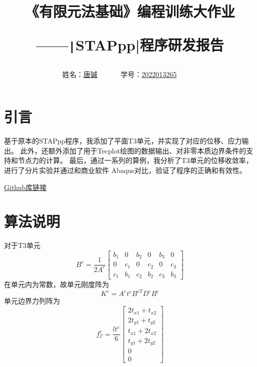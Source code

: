 \documentclass[12pt,a4paper]{article}
\newcommand{\code}{\texttt}
\begin{document}
\title{
{\heiti《有限元法基础》编程训练大作业
}

{
——\code|STAPpp|程序研发报告
}
}
\date{}

\author{
姓名：\underline{唐铖}~~~~~~
学号：\underline{2022013265}~~~~~~}

\maketitle

\section{引言}
基于原本的STAPpp程序，我添加了平面T3单元，并实现了对应的位移、应力输出。
此外，还额外添加了用于Tecplot绘图的数据输出、对非零本质边界条件的支持和节点力的计算。
最后，通过一系列的算例，我分析了T3单元的位移收敛率，进行了分片实验并通过和商业软件
Abaqus对比，验证了程序的正确和有效性。

\href{https://github.com/Maxwowq/STAPpp}{Github库链接}
\section{算法说明}
对于T3单元\cite{zhang2003}
\begin{equation}
    B^e = \frac{1}{2A^e}
    \begin{bmatrix}
        b_1 & 0 & b_2 & 0 & b_3 & 0\\
        0 & c_1 & 0 & c_2 & 0 & c_3\\
        c_1 & b_1 & c_2 & b_2 & c_3 & b_3
    \end{bmatrix}
\end{equation}
在单元内为常数，故单元刚度阵为
\begin{equation}
    K^e = A^et^eB^{eT}D^eB^e
\end{equation}
单元边界力列阵为
\begin{equation}
    f^e_{\Gamma} = 
    \frac{lt^e}{6}
    \begin{bmatrix}
        2t_{x1} + t_{x2}\\
        2t_{y1} + t_{y2}\\
        t_{x1} + 2t_{x2}\\
        t_{y1} + 2t_{y2}\\
        0\\0
    \end{bmatrix}
\end{equation}
\end{document}
